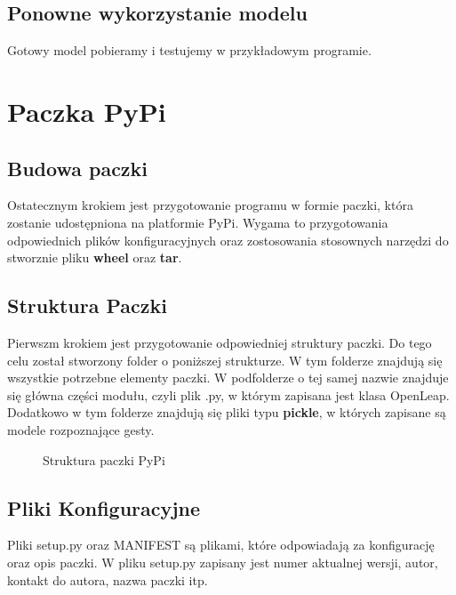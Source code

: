 \subsection{Ponowne wykorzystanie modelu}

\quad Gotowy model pobieramy i testujemy w przykładowym programie. 

\section{Paczka PyPi}
\subsection{Budowa paczki}

\quad Ostatecznym krokiem jest przygotowanie programu w formie paczki, która zostanie udostępniona na platformie PyPi. Wygama to przygotowania odpowiednich plików konfiguracyjnych oraz zostosowania stosownych narzędzi do stworznie pliku \textbf{wheel} oraz \textbf{tar}. 

\subsection{Struktura Paczki}
\quad Pierwszm krokiem jest przygotowanie odpowiedniej struktury paczki. Do tego celu został stworzony folder o poniższej strukturze. W tym folderze znajdują się wszystkie potrzebne elementy paczki. W podfolderze o tej samej nazwie znajduje się główna części modułu, czyli plik .py, w którym zapisana jest klasa OpenLeap. Dodatkowo w tym folderze znajdują się pliki typu \textbf{pickle}, w których zapisane są modele rozpoznające gesty.

\begin{figure}
\centering
    \begin{minipage}{7cm}
    \end{minipage}
    \caption{Struktura paczki PyPi}
\end{figure}

\subsection{Pliki Konfiguracyjne}
\quad Pliki setup.py oraz MANIFEST są plikami, które odpowiadają za konfigurację oraz opis paczki. W pliku setup.py zapisany jest numer aktualnej wersji, autor, kontakt do autora, nazwa paczki itp. 

